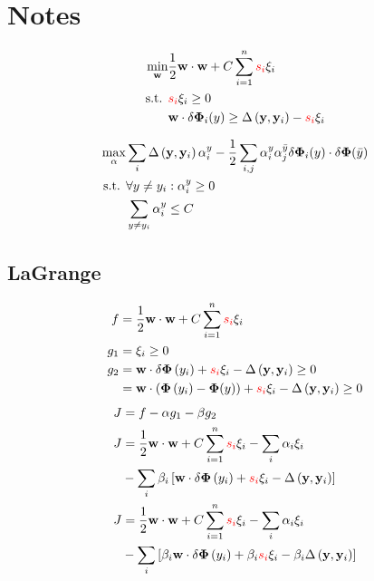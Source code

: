 \documentclass{IEEEtran}
\begin{document}
\section{Notes} %
\begin{align*}
    \min_{\mathbf{w}} & \frac{1}{2} \mathbf{w} \cdot \mathbf{w} + C \sum_{i=1}^n \textcolor{red}{s_i} \xi_i \\
    \text{s.t. } & \textcolor{red}{s_i} \xi_i \ge 0 \\
    & \mathbf{w} \cdot \delta \mathbf{\Phi}_i(y) \ge \Delta\left(\mathbf{y}, \mathbf{y}_i\right) - \textcolor{red}{s_i} \xi_i
\end{align*}

\begin{align*}
    \max_\alpha & \sum_i \Delta\left(\mathbf{y}, \mathbf{y}_i\right) \alpha_i^y - \frac{1}{2} \sum_{i,j} \alpha_i^y
    \alpha_j^{\bar{y}} \delta \mathbf{\Phi}_i(y) \cdot \delta \mathbf{\Phi}(\bar{y}) \\
    \text{s.t. } & \forall y \ne y_i : \alpha_i^y \ge 0 \\
    & \sum_{y \ne y_i} \alpha_i^y \le C
\end{align*}

\newpage

\subsection{LaGrange} %
\begin{align}
    f &= \frac{1}{2} \mathbf{w} \cdot \mathbf{w} + C \sum_{i=1}^n \textcolor{red}{s_i} \xi_i \\
    g_1 &= \xi_i \ge 0 \\
    g_2 &= \mathbf{w} \cdot \delta \mathbf{\Phi}\left(y_i\right) + \textcolor{red}{s_i} \xi_i - \Delta\left(\mathbf{y}, \mathbf{y}_i\right) \ge 0 \\
    &= \mathbf{w} \cdot \left(\mathbf{\Phi}\left(y_i\right) - \mathbf{\Phi}(y)\right) + \textcolor{red}{s_i} \xi_i
    - \Delta\left(\mathbf{y}, \mathbf{y}_i\right) \ge 0 \nonumber
\end{align}
\begin{align}
    J &= f - \alpha g_1 - \beta g_2 \\
    J &= \frac{1}{2} \mathbf{w} \cdot \mathbf{w} + C \sum_{i=1}^n \textcolor{red}{s_i} \xi_i -
        \sum_i \alpha_i \xi_i \nonumber \\ & -
        \sum_i \beta_i \left[\mathbf{w} \cdot \delta \mathbf{\Phi}\left(y_i\right) + \textcolor{red}{s_i} \xi_i
        - \Delta\left(\mathbf{y}, \mathbf{y}_i\right)\right] \nonumber \\
    J &= \frac{1}{2} \mathbf{w} \cdot \mathbf{w} + C \sum_{i=1}^n \textcolor{red}{s_i} \xi_i -
        \sum_i \alpha_i \xi_i \nonumber \\ & -
        \sum_i \left[ \beta_i \mathbf{w} \cdot \delta \mathbf{\Phi}\left(y_i\right) + \beta_i
        \textcolor{red}{s_i} \xi_i - \beta_i \Delta\left(\mathbf{y}, \mathbf{y}_i\right)\right] \nonumber \nonumber
\end{align}
\end{document}
